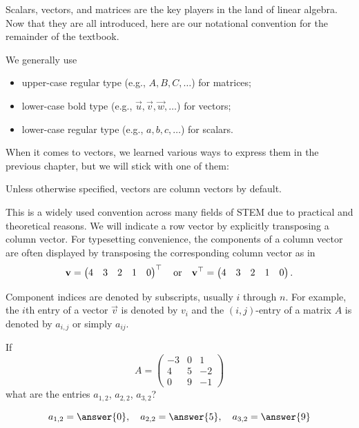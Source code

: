 \documentclass{ximera}
\begin{document}
\begin{concept}[Notation.]
  Scalars, vectors, and matrices are the key players in the land of
  linear algebra. Now that they are all introduced, here are our
  notational convention for the remainder of the textbook.

  We generally use
  \begin{itemize}
  \item upper-case regular type (e.g., $A, B, C, \ldots$) for matrices;
  \item lower-case bold type (e.g., $\vec{u}, \vec{v}, \vec{w}, \ldots$)
    for vectors;
  \item lower-case regular type (e.g., $a, b, c, \ldots$) for scalars.
  \end{itemize}

  When it comes to vectors, we learned various ways to express them in
  the previous chapter, but we will stick with one of them:

  \begin{center}
    Unless otherwise specified, vectors are column vectors by default.
  \end{center}

  This is a widely used convention across many fields of STEM due to
  practical and theoretical reasons. We will indicate a row vector by
  explicitly transposing a column vector. For typesetting convenience,
  the components of a column vector are often displayed by transposing
  the corresponding column vector as in
  \[
    \mathbf{v} =
    \begin{pmatrix}
      4 & 3 & 2 & 1 & 0
    \end{pmatrix}^\top
    \quad\text{or}\quad
    \mathbf{v}^\top =
    \begin{pmatrix}
      4 & 3 & 2 & 1 & 0
    \end{pmatrix}.
  \]

  Component indices are denoted by subscripts, usually $i$ through
  $n$. For example, the $i$th entry of a vector $\vec{v}$ is denoted
  by $v_i$ and the $(i,j)$-entry of a matrix $A$ is denoted by
  $a_{i,j}$ or simply $a_{ij}$.
\end{concept}


\begin{question}
  If
  \[A= \begin{pmatrix}
    -3 & 0 & 1\\
    4 & 5 & -2\\
    0 & 9 & -1
  \end{pmatrix}
\]
what are the entries $a_{1,2}$, $a_{2,2}$, $a_{3,2}$?
\begin{prompt}
  \[
    a_{1,2} = \answer{0}, \quad a_{2,2} = \answer{5}, \quad a_{3,2} = \answer{9}
  \]
\end{prompt}
\end{question}
\end{document}
